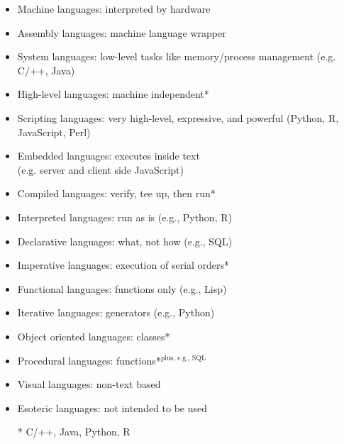 \documentclass[xcolor={dvipsnames}]{beamer}
\begin{document}
{\begin{columns}
\begin{column}{0.55\textwidth}
\begin{itemize}
\end{itemize}
\end{column}
\begin{column}{0.5\textwidth}
\begin{itemize}
\item Machine languages: interpreted by hardware
\item Assembly languages: machine language wrapper
\item System languages: low-level tasks like memory/process management (e.g. C/++, Java)
\item High-level languages:  machine independent*
\item Scripting languages: very high-level, expressive, and powerful (Python, R, JavaScript, Perl)
\item Embedded languages: executes inside text\\ (e.g. server and client side JavaScript) 
\item Compiled languages:  verify, tee up, then run*
\item Interpreted languages:  run as is (e.g., Python, R)
\item Declarative languages: what, not how (e.g., SQL)
\item Imperative languages: execution of serial orders*
\item Functional languages: functions only (e.g., Lisp)
\item Iterative languages: generators (e.g., Python)
\item Object oriented languages: classes*
\item Procedural languages: functions*$^{\text{plus, e.g., SQL}}$
\item Visual languages: non-text based
\item Esoteric languages: not intended to be used
\item[]
\item[*] C/++, Java, Python, R
\end{itemize}
\end{column}
\end{columns}

}
\end{document}
